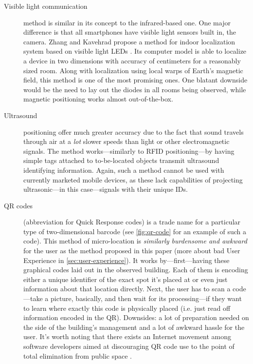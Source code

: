 \begin{description}
	\item[Visible light communication] method is similar in its concept to the infrared-based one. One major difference is that all smartphones have visible light sensors built in, the camera. Zhang and Kavehrad propose a method for indoor localization system based on visible light LEDs \cite{Zhang:visible-light}. Its computer model is able to localize a device in two dimensions with accuracy of centimeters for a reasonably sized room. Along with localization using local warps of Earth's magnetic field, this method is one of the most promising ones. One blatant downside would be the need to lay out the diodes in all rooms being observed, while magnetic positioning works almost out-of-the-box.
	
	\item[Ultrasound] positioning offer much greater accuracy due to the fact that sound travels through air at a \emph{lot} slower speeds than light or other electromagnetic signals. The method works---similarly to RFID positioning---by having simple tags attached to to-be-located objects transmit ultrasound identifying information. Again, such a method cannot be used with currently marketed mobile devices, as these lack capabilities of projecting ultrasonic---in this case---signals with their unique IDs.
	
	\item[QR codes] (abbreviation for Quick Response codes) is a trade name for a particular type of two-dimensional barcode (see \cref{fig:qr-code} for an example of such a code). This method of micro-location is \emph{similarly burdensome and awkward} for the user as the method proposed in this paper (more about bad User Experience in \cref{sec:user-experience}). It works by---first---having these graphical codes laid out in the observed building. Each of them is encoding either a unique identifier of the exact spot it's placed at or even just information about that location directly. Next, the user has to scan a code---take a picture, basically, and then wait for its processing---if they want to learn where exactly this code is physically placed (i.e. just read off information encoded in the QR). Downsides: a lot of preparation needed on the side of the building's management and a lot of awkward hassle for the user. It's worth noting that there exists an Internet movement among software developers aimed at discouraging QR code use to the point of total elimination from public space \cite{should-i-use-qr}.
	

\end{description}
